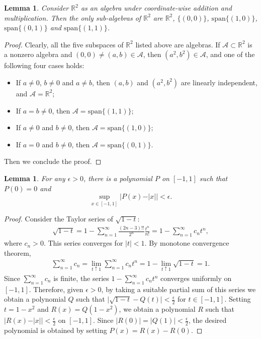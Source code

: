 \documentclass{article}
\numberwithin{equation}{section}
\newcommand{\bbR}{\mathbb{R}}
\renewcommand{\cal}{\mathcal}
\theoremstyle{plain}
\newtheorem{lemma}[theorem]{Lemma}
\theoremstyle{definition}
\begin{document}
\begin{lemma}\label{swlemma1}
Consider $\bbR^2$ as an algebra under coordinate-wise addition and multiplication. Then the only sub-algebras of $\bbR^2$ are $\bbR^2$, $\{(0,0)\}$, $\mathrm{span}\{(1,0)\}$, $\mathrm{span}\{(0,1)\}$ and $\mathrm{span}\{(1,1)\}$.
\end{lemma}
\begin{proof}
Clearly, all the five subspaces of $\bbR^2$ listed above are algebras. If $\cal{A}\subset\bbR^2$ is a nonzero algebra and $(0,0)\neq(a,b)\in\cal{A}$, then $(a^2,b^2)\in\cal{A}$, and one of the following four cases holds:
\begin{itemize}
	\item If $a\neq 0$, $b\neq 0$ and $a\neq b$, then $(a,b)$ and $(a^2,b^2)$ are linearly independent, and $\cal{A}=\bbR^2$;
	\item If $a=b\neq 0$, then $\cal{A}=\mathrm{span}\{(1,1)\}$;
	\item If $a\neq 0$ and $b\neq 0$, then $\cal{A}=\mathrm{span}\{(1,0)\}$;
	\item If $a=0$ and $b\neq 0$, then $\cal{A}=\mathrm{span}\{(0,1)\}$.
\end{itemize}
Then we conclude the proof.
\end{proof}

\begin{lemma}\label{swlemma2}
For any $\epsilon>0$, there is a polynomial $P$ on $[-1,1]$ such that $P(0)=0$ and $$\sup_{x\in[-1,1]}\left\vert P(x)-\vert x\vert\right\vert <\epsilon.$$
\end{lemma}
\begin{proof}
Consider the Taylor series of $\sqrt{1-t}$:
\begin{align*}
	\sqrt{1-t}=1-\sum_{n=1}^\infty\frac{(2n-3)!!}{2^n}\frac{t^n}{n!}=1-\sum_{n=1}^\infty c_n t^n,
\end{align*}
where $c_n>0$. This series converges for $\vert t\vert<1$. By monotone convergence theorem, 
\begin{align*}
	\sum_{n=1}^\infty c_n=\lim_{t\uparrow 1}\sum_{n=1}^\infty c_nt^n=1-\lim_{t\uparrow 1}\sqrt{1-t}=1.
\end{align*}
Since $\sum_{n=1}^\infty c_n$ is finite, the series $1-\sum_{n=1}^\infty c_nt^n$ converges uniformly on $[-1,1]$. Therefore, given $\epsilon>0$, by taking a suitable partial sum of this series we obtain a polynomial $Q$ such that $\vert\sqrt{1-t}-Q(t)\vert<\frac{\epsilon}{2}$ for $t\in[-1,1]$. Setting $t=1-x^2$ and $R(x)=Q(1-x^2)$, we obtain a polynomial $R$ such that $\left\vert R(x)-\vert x\vert\right\vert<\frac{\epsilon}{2}$ on $[-1,1]$. Since $\vert R(0)\vert=\vert Q(1)\vert<\frac{\epsilon}{2}$, the desired polynomial is obtained by setting $P(x)=R(x)-R(0)$.
\end{proof}
\end{document}
